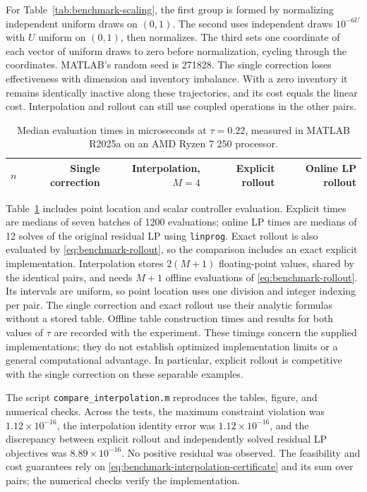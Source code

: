 \documentclass[10pt]{article}
\begin{document}
For Table~\ref{tab:benchmark-scaling}, the first group is formed by normalizing independent uniform draws on $(0,1)$. The second uses independent draws $10^{-6U}$ with $U$ uniform on $(0,1)$, then normalizes. The third sets one coordinate of each vector of uniform draws to zero before normalization, cycling through the coordinates. MATLAB's random seed is 271828. The single correction loses effectiveness with dimension and inventory imbalance. With a zero inventory it remains identically inactive along these trajectories, and its cost equals the linear cost. Interpolation and rollout can still use coupled operations in the other pairs.

\begin{table}[htbp]
\centering
\begin{tabular}{rrrrr}
\hline
$n$ & Single correction & Interpolation, $M=4$ & Explicit rollout & Online LP rollout\\
\hline

\end{tabular}
\caption{Median evaluation times in microseconds at $\tau=0.22$, measured in MATLAB R2025a on an AMD Ryzen 7 250 processor.}
\label{tab:benchmark-timing}
\end{table}

Table~\ref{tab:benchmark-timing} includes point location and scalar controller evaluation. Explicit times are medians of seven batches of 1200 evaluations; online LP times are medians of 12 solves of the original residual LP using \texttt{linprog}. Exact rollout is also evaluated by \eqref{eq:benchmark-rollout}, so the comparison includes an exact explicit implementation. Interpolation stores $2(M+1)$ floating-point values, shared by the identical pairs, and needs $M+1$ offline evaluations of \eqref{eq:benchmark-rollout}. Its intervals are uniform, so point location uses one division and integer indexing per pair. The single correction and exact rollout use their analytic formulas without a stored table. Offline table construction times and results for both values of $\tau$ are recorded with the experiment. These timings concern the supplied implementations; they do not establish optimized implementation limits or a general computational advantage. In particular, explicit rollout is competitive with the single correction on these separable examples.

The script \texttt{compare\_interpolation.m} reproduces the tables, figure, and numerical checks. Across the tests, the maximum constraint violation was $1.12\times10^{-16}$, the interpolation identity error was $1.12\times10^{-16}$, and the discrepancy between explicit rollout and independently solved residual LP objectives was $8.89\times10^{-16}$. No positive residual was observed. The feasibility and cost guarantees rely on \eqref{eq:benchmark-interpolation-certificate} and its sum over pairs; the numerical checks verify the implementation.
\end{document}
